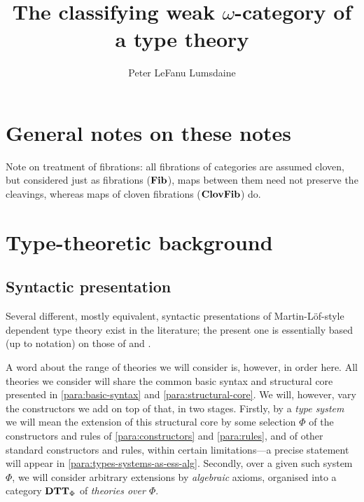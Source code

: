 \documentclass{amsart}
\newcommand{\stuff}{{\Phi}}
\begin{document}

\title{The classifying weak $\omega$-category of a type theory}

\author[P. LeF. Lumsdaine]{Peter LeFanu Lumsdaine}

\maketitle
\tableofcontents

\section*{General notes on these notes}

Note on treatment of fibrations: all fibrations of categories are assumed cloven, but considered just as fibrations ($\mathbf{Fib}$), maps between them need not preserve the cleavings, whereas maps of cloven fibrations ($\mathbf{ClovFib}$) do.


\section{Type-theoretic background}


\subsection{Syntactic presentation}

\begin{para}Several different, mostly equivalent, syntactic presentations of Martin-Löf-style dependent type theory exist in the literature; the present one is essentially based (up to notation) on those of \cite{pitts:categorial-logic} and \cite{hofmann:syntax-and-semantics}.

A word about the range of theories we will consider is, however, in order here.  All theories we consider will share the common basic syntax and structural core presented in \ref{para:basic-syntax} and \ref{para:structural-core}.  We will, however, vary the constructors we add on top of that, in two stages.  Firstly, by a \emph{type system} we will mean the extension of this structural core by some selection $\stuff$ of the constructors and rules of \ref{para:constructors} and \ref{para:rules}, and of other standard constructors and rules, within certain limitations---a precise statement will appear in \ref{para:types-systems-as-ess-alg}.  Secondly, over a given such system $\stuff$, we will consider arbitrary extensions by \emph{algebraic} axioms, organised into a category $\DTT_\stuff$ of \emph{theories over $\stuff$}.
\end{para}
\end{document}
